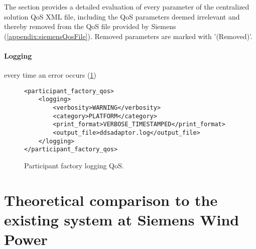 The section provides a detailed evaluation of every parameter of the centralized solution QoS XML file, including the QoS parameters deemed irrelevant and thereby removed from the QoS file provided by Siemens (\cref{appendix:siemensQosFile}). Removed parameters are marked with '(Removed)'.

\paragraph{Logging} every time an error occurs (\cref{fig:parFacLogQos})


\begin{figure}
\begin{lstlisting}
<participant_factory_qos>
    <logging>
        <verbosity>WARNING</verbosity>
        <category>PLATFORM</category>
        <print_format>VERBOSE_TIMESTAMPED</print_format>
        <output_file>ddsadaptor.log</output_file>
    </logging>
</participant_factory_qos>
\end{lstlisting}
\caption[Participant factory logging QoS]{
		\label{fig:parFacLogQos} 
		\footnotesize{Participant factory logging QoS.}
	}
\end{figure}







\section{Theoretical comparison to the existing system at Siemens Wind Power}

